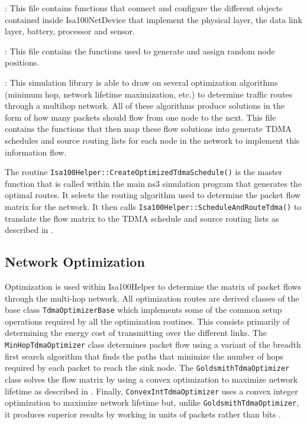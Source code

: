 \documentclass[12pt,letterpaper]{article}
\begin{document}
\begin{itemize}

: This file contains functions that connect and configure the different objects contained inside Isa100NetDevice that implement the physical layer, the data link layer, battery, processor and sensor.

:  This file contains the functions used to generate and assign random node positions.

:  This simulation library is able to draw on several optimization algorithms (minimum hop, network lifetime maximization, etc.) to determine traffic routes through a multihop network.  All of these algorithms produce solutions in the form of how many packets should flow from one node to the next.  This file contains the functions that then map these flow solutions into generate TDMA schedules and source routing lists for each node in the network to implement this information flow.

The routine {\tt Isa100Helper::CreateOptimizedTdmaSchedule()} is the master function that is called within the main ns3 simulation program that generates the optimal routes.  It selects the routing algorithm used to determine the packet flow matrix for the network.  It then calls {\tt Isa100Helper::ScheduleAndRouteTdma()} to translate the flow matrix to the TDMA schedule and source routing lists as described in \cite{me-tii-2018}.

\end{itemize}

\subsection{Network Optimization}

Optimization is used within Isa100Helper to determine the matrix of packet flows through the multi-hop network.  All optimization routes are derived classes of the base class {\tt TdmaOptimizerBase} which implements some of the common setup operations required by all the optimization routines.  This consists primarily of determining the energy cost of transmitting over the different links.  The {\tt MinHopTdmaOptimizer} class determines packet flow using a variant of the breadth first search algorithm that finds the paths that minimize the number of hops required by each packet to reach the sink node.  The {\tt GoldsmithTdmaOptimizer} class solves the flow matrix by using a convex optimization to maximize network lifetime as described in \cite{me-tii-2018, cui-s-2007}.  Finally, {\tt ConvexIntTdmaOptimizer} uses a convex integer optimization to maximize network lifetime but, unlike {\tt GoldsmithTdmaOptimizer}, it produces superior results by working in units of packets rather than bits \cite{me-tii-2018}.
\end{document}
